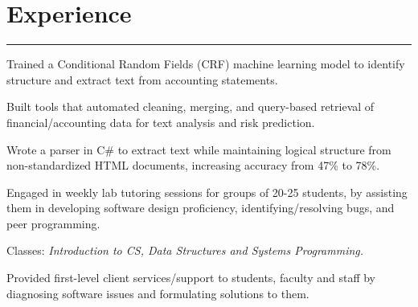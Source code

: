 \documentclass[]{dafirebanks-resume-openfont}
\begin{document}
\begin{minipage}[t]{0.66\textwidth} 

\vspace{-1.2pt}
\section{Experience}
\vspace{-3pt}
{\color{blue}\hrule} \vspace{5pt}
\hspace{40pt} 
{} 
\location{}
\vspace{\topsep} %
\begin{tightemize}
    \item Trained a Conditional Random Fields (CRF) machine learning model to identify structure and extract text from accounting statements.
	\item Built tools that automated cleaning, merging, and query-based retrieval of financial/accounting data for text analysis and risk prediction.
	\item Wrote a parser in C\# to extract text while maintaining logical structure from non-standardized HTML documents, increasing accuracy from 47\% to 78\%.
\end{tightemize}
\sectionsep

\hspace{54pt}
 \location{} 
\begin{tightemize}
	\item Engaged in weekly lab tutoring sessions for groups of 20-25 students, by assisting them in developing software design proficiency, identifying/resolving bugs, and peer programming. 
	\item Classes: \textit{Introduction to CS, Data Structures and Systems Programming.}
\end{tightemize}
\sectionsep

\hspace{127pt}
\location{}
\begin{tightemize}
	\item Provided first-level client services/support to students, faculty and staff by diagnosing software issues and formulating solutions to them. 
\end{tightemize}
\sectionsep


\end{minipage}
\end{document}
